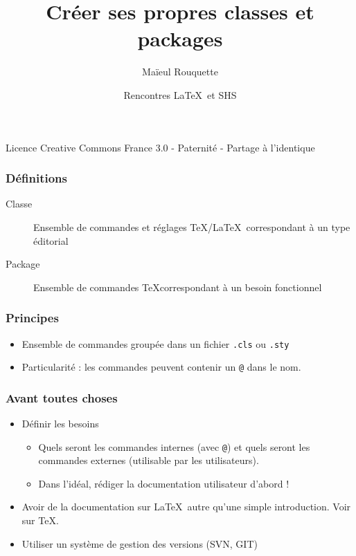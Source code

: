 \documentclass{beamer}
\author{Maïeul Rouquette}
\date{Rencontres \LaTeX\ et SHS}
\title{Créer ses propres classes et packages}
\institute{Université de Lausanne --- IRSB}
\begin{document}
\begin{frame}
	\titlepage
	\vfill
	{\tiny Licence Creative Commons France 3.0 - Paternité - Partage à l'identique}
\end{frame}


\begin{frame}
	\frametitle{Définitions}
	\begin{description}
		\item[Classe]{Ensemble de commandes et réglages \TeX/\LaTeX\ correspondant à un type éditorial}
		\item[Package]{Ensemble de commandes \TeX correspondant à un besoin fonctionnel}
	\end{description}
\end{frame}

\begin{frame}
	\frametitle{Principes}
	\begin{itemize}
		\item<1->Ensemble de commandes groupée dans un fichier \verb+.cls+ ou \verb+.sty+
		\item<2->Particularité : les commandes peuvent contenir un \verb+@+ dans le nom.
	\end{itemize}
\end{frame}
\begin{frame}
	\frametitle{Avant toutes choses}
	\begin{itemize}
		\item<1->Définir les besoins
			\begin{itemize}
				\item<2->Quels seront les commandes internes (avec \verb+@+) et quels seront les commandes externes (utilisable par les utilisateurs).
				\item<3->Dans l'idéal, rédiger la documentation utilisateur d'abord !
			\end{itemize}
		\item<4->Avoir de la documentation sur \LaTeX\ autre qu'une simple introduction. Voir sur \TeX.
		\item<5->Utiliser un système de gestion des versions (SVN, GIT)
	\end{itemize}
\end{frame}
\end{document}
